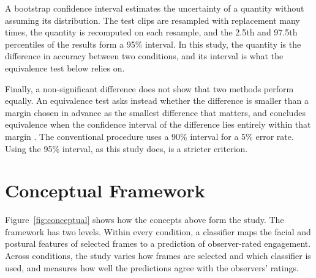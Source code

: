 A bootstrap confidence interval \cite{efron1993} estimates the uncertainty of a quantity without assuming its distribution. The test clips are resampled with replacement many times, the quantity is recomputed on each resample, and the 2.5th and 97.5th percentiles of the results form a 95\% interval. In this study, the quantity is the difference in accuracy between two conditions, and its interval is what the equivalence test below relies on.

Finally, a non-significant difference does not show that two methods perform equally. An equivalence test asks instead whether the difference is smaller than a margin chosen in advance as the smallest difference that matters, and concludes equivalence when the confidence interval of the difference lies entirely within that margin \cite{lakens2017}. The conventional procedure uses a 90\% interval for a 5\% error rate. Using the 95\% interval, as this study does, is a stricter criterion.



\section{Conceptual Framework}
\label{sec:conceptual}

Figure~\ref{fig:conceptual} shows how the concepts above form the study. The framework has two levels. Within every condition, a classifier maps the facial and postural features of selected frames to a prediction of observer-rated engagement. Across conditions, the study varies how frames are selected and which classifier is used, and measures how well the predictions agree with the observers' ratings.


